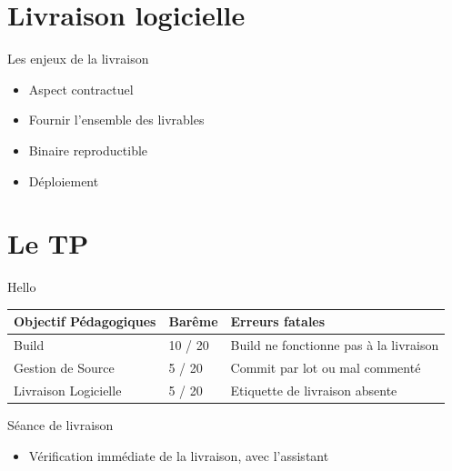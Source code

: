 \documentclass[handout]{beamer}
\begin{document}
\section{Livraison logicielle}

\begin{frame}
	\begin{block}{Les enjeux de la livraison}
		\begin{itemize}
 			\item Aspect contractuel
			\item Fournir l'ensemble des livrables
			\item Binaire reproductible
			\item Déploiement 
		\end{itemize}
	\end{block}
\end{frame}

\section{Le TP}

\begin{frame}
	\begin{block}{Hello}
	\small{
			\begin{tabular}{|p{3cm}|p{1.5cm}|p{4.5cm}|} %
				\hline
				\textbf{Objectif Pédagogiques} 	& \textbf{Barême} & \textbf{Erreurs fatales}	\\ 
				\hline
				Build 
				& 10 / 20  
				&  
				Build ne fonctionne pas à la livraison
				\\ 
				\hline
				Gestion de Source 
				& 5 / 20
				& 
				Commit  par lot ou mal commenté 
				\\ 
				\hline
				Livraison Logicielle
				& 5 / 20
				& Etiquette de livraison absente 
				\\
				\hline 
			\end{tabular}
	}
	\end{block}

	\begin{block}{Séance de livraison}
		\begin{itemize}
			\item Vérification immédiate de la livraison, avec l'assistant
		\end{itemize}

	\end{block}

\end{frame}
\end{document}
